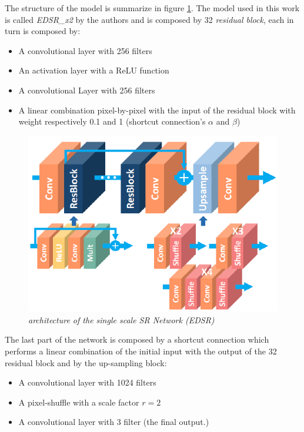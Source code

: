 \documentclass[12pt,a4paper]{report}
\begin{document}
The structure of the model is summarize in figure \ref{fig:edsr-structure}.
The model used in this work is called {\it EDSR\_x2} by the authors and is composed by 32 {\it residual block}, each in turn is composed by: 

\begin{itemize}
 \setlength\itemsep{-0.2em}
 \item A convolutional layer with 256 filters
 \item An activation layer with a ReLU function
 \item A convolutional Layer with 256 filters
 \item A linear combination pixel-by-pixel with the input of the residual block with weight respectively 0.1 and 1 (shortcut connection's $\alpha$ and $\beta$)
\end{itemize}

\begin{figure}[H]
 \centering
 \includegraphics[scale=0.4]{./images/edsr_structure.png}
 \caption{\it architecture of the single scale SR Network (EDSR)}
 \label{fig:edsr-structure}
\end{figure}

The last part of the network is composed by a shortcut connection which performs a linear combination of the initial input with the output of the 32 residual block and by the up-sampling block:

\begin{itemize}
 \setlength\itemsep{-0.2em}
 \item A convolutional layer with 1024 filters 
 \item A pixel-shuffle with a scale factor $r=2$  
 \item A convolutional layer with 3 filter (the final output.)
\end{itemize}
\end{document}

